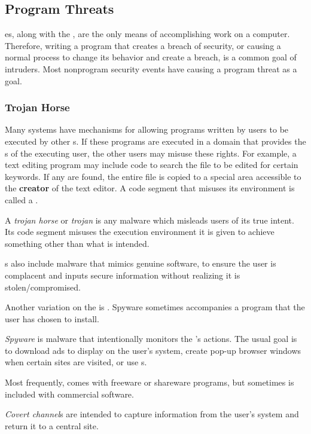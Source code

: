 \subsection{Program Threats}\label{subsec:Program_Threats}
es, along with the , are the only means of accomplishing work on a computer.
Therefore, writing a program that creates a breach of security, or causing a normal process to change its behavior and create a breach, is a common goal of intruders.
Most nonprogram security events have causing a program threat as a goal.

\subsubsection{Trojan Horse}\label{subsubsec:Trojan_Horse}
Many systems have mechanisms for allowing programs written by users to be executed by other s.
If these programs are executed in a domain that provides the s of the executing user, the other users may misuse these rights.
For example, a text editing program may include code to search the file to be edited for certain keywords.
If any are found, the entire file is copied to a special area accessible to the \textbf{creator} of the text editor.
A code segment that misuses its environment is called a .

\begin{definition}\label{def:Trojan_Horse}
  A \emph{trojan horse} or \emph{trojan} is any malware which misleads users of its true intent.
  Its code segment misuses the execution environment it is given to achieve something other than what is intended.
\end{definition}

s also include malware that mimics genuine software, to ensure the user is complacent and inputs secure information without realizing it is stolen/compromised.

Another variation on the  is .
Spyware sometimes accompanies a program that the user has chosen to install.
\begin{definition}[Spyware]\label{def:Spyware}
  \emph{Spyware} is malware that intentionally monitors the 's actions.
  The usual goal is to download ads to display on the user’s system, create pop-up browser windows when certain sites are visited, or use s.
\end{definition}

Most frequently,  comes with freeware or shareware programs, but sometimes is included with commercial software.

\begin{definition}\label{def:Covert_Channel}
  \emph{Covert channel}s are intended to capture information from the user’s system and return it to a central site.
\end{definition}


